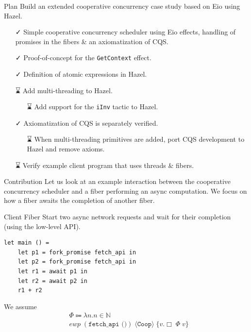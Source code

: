 \documentclass[aspectratio=43]{beamer}
\newcommand{\done}{{\symfontextra ✓}}
\newcommand{\tbd}{{\symfontextra ⌛}}
\newcommand{\proto}{\texttt{Coop}}
\newcommand{\ewp}[3]{\textit{ewp}\; (#1)\; \langle #2 \rangle\; \{#3\}}
\newcommand{\pers}[1]{\Box\; #1}
\begin{document}
\begin{frame}{Plan}
    Build an extended cooperative concurrency case study based on Eio using Hazel.
    \begin{itemize}
        \item[\done{}] Simple cooperative concurrency scheduler using Eio effects, handling of promises in the fibers \& an axiomatization of CQS.
        \item[\done{}] Proof-of-concept for the \texttt{GetContext} effect.
        \item[\done{}] Definition of atomic expressions in Hazel.
        \item[\tbd{}] Add multi-threading to Hazel.
            \begin{itemize}
                \item[\tbd{}] Add support for the \texttt{iInv} tactic to Hazel.
            \end{itemize}
        \item[\done{}] Axiomatization of CQS is separately verified.
            \begin{itemize}
                \item[\tbd{}] When multi-threading primitives are added, port CQS development to Hazel and remove axioms.
            \end{itemize}
        \item[\tbd{}] Verify example client program that uses threads \& fibers.
    \end{itemize}
\end{frame}

\begin{frame}{Contribution}
    Let us look at an example interaction between the cooperative concurrency scheduler and a fiber performing an async computation.
    We focus on how a fiber awaits the completion of another fiber.
\end{frame}

\begin{frame}[fragile]{Client Fiber}
    Start two async network requests and wait for their completion (using the low-level API).
    \begin{verbatim}
let main () = 
    let p1 = fork_promise fetch_api in
    let p2 = fork_promise fetch_api in
    let r1 = await p1 in 
    let r2 = await p2 in 
    r1 + r2
    \end{verbatim}
    We assume
    \begin{align*}
         & \Phi \Coloneqq \lambda n. n \in \mathbb{N}                 \\
         & \ewp{\texttt{fetch\_api ()}}{\proto{}}{v. \pers{\Phi\; v}}
    \end{align*}
\end{frame}
\end{document}
